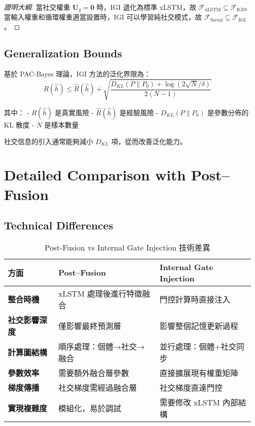 \documentclass[11pt,a4paper]{article}
\begin{document}
\begin{proof}[證明大綱]
當社交權重 $\mathbf{U}_g = \mathbf{0}$ 時，IGI 退化為標準 xLSTM，故 $\mathcal{F}_{\text{xLSTM}} \subseteq \mathcal{F}_{\text{IGI}}$。
當輸入權重和循環權重適當設置時，IGI 可以學習純社交模式，故 $\mathcal{F}_{\text{Social}} \subseteq \mathcal{F}_{\text{IGI}}$。
\end{proof}

\subsection{Generalization Bounds}

基於 PAC-Bayes 理論，IGI 方法的泛化界限為：
\begin{equation}
R(\hat{h}) \leq \hat{R}(\hat{h}) + \sqrt{\frac{D_{KL}(P \| P_0) + \log(2\sqrt{N}/\delta)}{2(N-1)}}
\end{equation}

其中：
- $R(\hat{h})$ 是真實風險
- $\hat{R}(\hat{h})$ 是經驗風險  
- $D_{KL}(P \| P_0)$ 是參數分佈的 KL 散度
- $N$ 是樣本數量

社交信息的引入通常能夠減小 $D_{KL}$ 項，從而改善泛化能力。

\section{Detailed Comparison with Post--Fusion}

\subsection{Technical Differences}

\begin{table}[h]
\centering
\begin{tabular}{|p{3cm}|p{5cm}|p{5cm}|}
\hline
\textbf{方面} & \textbf{Post--Fusion} & \textbf{Internal Gate Injection} \\
\hline
\textbf{整合時機} & xLSTM 處理後進行特徵融合 & 門控計算時直接注入 \\
\hline
\textbf{社交影響深度} & 僅影響最終預測層 & 影響整個記憶更新過程 \\
\hline
\textbf{計算圖結構} & 順序處理：個體→社交→融合 & 並行處理：個體+社交同步 \\
\hline
\textbf{參數效率} & 需要額外融合層參數 & 直接擴展現有權重矩陣 \\
\hline
\textbf{梯度傳播} & 社交梯度需經過融合層 & 社交梯度直達門控 \\
\hline
\textbf{實現複雜度} & 模組化，易於調試 & 需要修改 xLSTM 內部結構 \\
\hline
\end{tabular}
\caption{Post-Fusion vs Internal Gate Injection 技術差異}
\end{table}
\end{document}

